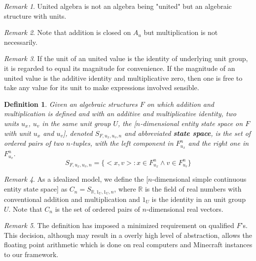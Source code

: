 \documentclass{book}
\newtheorem{definition}{Definition}
\theoremstyle{definition}\newtheorem{mechanism}{Mechanism}
\theoremstyle{remark}\newtheorem*{remark}{Remark}
\begin{document}
\begin{remark}
	United algebra is not an algebra being "united" but an algebraic structure with units.
\end{remark}

\begin{remark}
	Note that addition is closed on $A_u$ but multiplication is not necessarily.
\end{remark}

\begin{remark}
	If the unit of an united value is the identity of underlying unit group, it is regarded to equal its magnitude for convenience. If the magnitude of an united value is the additive identity and multiplicative zero, then one is free to take any value for its unit to make expressions involved sensible.
\end{remark}

\begin{definition}
	Given an algebraic structures $F$ on which addition and multiplication is defined and with an additive and multiplicative identity, two units $u_x$, $u_v$ in the same unit group $U$, the [$n$-dimensional entity state space on $F$ with unit $u_x$ and $u_v$], denoted $S_{F, u_x, u_v, n}$ and abbreviated {\bf{state space}}, is the set of ordered pairs of two $n$-tuples, with the left component in $F_{u_x}^n$ and the right one in $F_{u_v}^n$.
	\begin{equation*}
		S_{F, u_x, u_v, n} = \{ <x, v> : x \in F_{u_x}^n \land v \in F_{u_v}^n\}
	\end{equation*}
\end{definition}

\begin{remark}
	As a idealized model, we define the [$n$-dimensional simple continuous entity state space] as $C_n = S_{\mathbb{R}, 1_U, 1_U, n}$, where $\mathbb{R}$ is the field of real numbers with conventional addition and multiplication and $1_U$ is the identity in an unit group $U$. Note that $C_n$ is the set of ordered pairs of $n$-dimensional real vectors.
\end{remark}

\begin{remark}
	The definition has imposed a minimized requirement on qualified $F$'s. This decision, although may result in a overly high level of abstraction, allows the floating point arithmetic which is done on real computers and Minecraft instances to our framework.
\end{remark}
\end{document}
